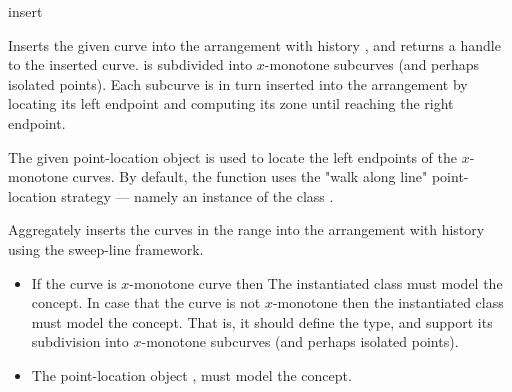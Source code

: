 \begin{ccRefFunction}{insert}



Inserts the given curve  into the arrangement with history ,
and returns a handle to the inserted curve.  is subdivided into
$x$-monotone subcurves (and perhaps isolated points). Each subcurve is in
turn inserted into the arrangement by locating its left endpoint and
computing its zone until reaching the right endpoint.

The given point-location object  is used to locate the left
endpoints of the $x$-monotone curves. By default, the function uses the
"walk along line" point-location strategy --- namely an instance of
the class .



Aggregately inserts the curves in the range \ccc{[first,last)} into the
arrangement with history  using the sweep-line framework.


\ccRequirements
\begin{itemize}
\item If the curve is $x$-monotone curve then The instantiated
   class must model the 
  concept. In case that the curve is not $x$-monotone then the
  instantiated  class must model the
   concept. That is, it should define the
   type, and support its subdivision into $x$-monotone
  subcurves (and perhaps isolated points). 
\item The point-location object , must model the
   concept.
\end{itemize}

\end{ccRefFunction}

\ccRefPageEnd
